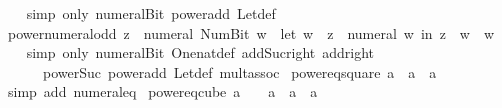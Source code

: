 \begin{isabellebody}
%
\isadelimproof
\ \ %
\endisadelimproof
%
\isatagproof
{}\isamarkupfalse%
\ {\isacharparenleft}{\kern0pt}simp\ only{\isacharcolon}{\kern0pt}\ numeral{\isacharunderscore}{\kern0pt}Bit{}\ power{\isacharunderscore}{\kern0pt}add\ Let{\isacharunderscore}{\kern0pt}def{\isacharparenright}{\kern0pt}%
\endisatagproof
{\isafoldproof}%
%
\isadelimproof
\isanewline
%
\endisadelimproof
\isanewline
{}\isamarkupfalse%
\ power{\isacharunderscore}{\kern0pt}numeral{\isacharunderscore}{\kern0pt}odd{\isacharcolon}{\kern0pt}\ {\isachardoublequoteopen}z\ {\isacharcircum}{\kern0pt}\ numeral\ {\isacharparenleft}{\kern0pt}Num{\isachardot}{\kern0pt}Bit{}\ w{\isacharparenright}{\kern0pt}\ {\isacharequal}{\kern0pt}\ {\isacharparenleft}{\kern0pt}let\ w\ {\isacharequal}{\kern0pt}\ z\ {\isacharcircum}{\kern0pt}\ {\isacharparenleft}{\kern0pt}numeral\ w{\isacharparenright}{\kern0pt}\ in\ z\ {\isacharasterisk}{\kern0pt}\ w\ {\isacharasterisk}{\kern0pt}\ w{\isacharparenright}{\kern0pt}{\isachardoublequoteclose}\isanewline
%
\isadelimproof
\ \ %
\endisadelimproof
%
\isatagproof
{}\isamarkupfalse%
\ {\isacharparenleft}{\kern0pt}simp\ only{\isacharcolon}{\kern0pt}\ numeral{\isacharunderscore}{\kern0pt}Bit{}\ One{\isacharunderscore}{\kern0pt}nat{\isacharunderscore}{\kern0pt}def\ add{\isacharunderscore}{\kern0pt}Suc{\isacharunderscore}{\kern0pt}right\ add{\isacharunderscore}{\kern0pt}{}{\isacharunderscore}{\kern0pt}right\isanewline
\ \ \ \ \ \ power{\isacharunderscore}{\kern0pt}Suc\ power{\isacharunderscore}{\kern0pt}add\ Let{\isacharunderscore}{\kern0pt}def\ mult{\isachardot}{\kern0pt}assoc{\isacharparenright}{\kern0pt}%
\endisatagproof
{\isafoldproof}%
%
\isadelimproof
\isanewline
%
\endisadelimproof
\isanewline
{}\isamarkupfalse%
\ power{}{\isacharunderscore}{\kern0pt}eq{\isacharunderscore}{\kern0pt}square{\isacharcolon}{\kern0pt}\ {\isachardoublequoteopen}a\ {\isacharequal}{\kern0pt}\ a\ {\isacharasterisk}{\kern0pt}\ a{\isachardoublequoteclose}\isanewline
%
\isadelimproof
\ \ %
\endisadelimproof
%
\isatagproof
{}\isamarkupfalse%
\ {\isacharparenleft}{\kern0pt}simp\ add{\isacharcolon}{\kern0pt}\ numeral{\isacharunderscore}{\kern0pt}{}{\isacharunderscore}{\kern0pt}eq{\isacharunderscore}{\kern0pt}{}{\isacharparenright}{\kern0pt}%
\endisatagproof
{\isafoldproof}%
%
\isadelimproof
\isanewline
%
\endisadelimproof
\isanewline
{}\isamarkupfalse%
\ power{}{\isacharunderscore}{\kern0pt}eq{\isacharunderscore}{\kern0pt}cube{\isacharcolon}{\kern0pt}\ {\isachardoublequoteopen}a\ {\isacharcircum}{\kern0pt}\ {}\ {\isacharequal}{\kern0pt}\ a\ {\isacharasterisk}{\kern0pt}\ a\ {\isacharasterisk}{\kern0pt}\ a{\isachardoublequoteclose}\isanewline

\end{isabellebody}
